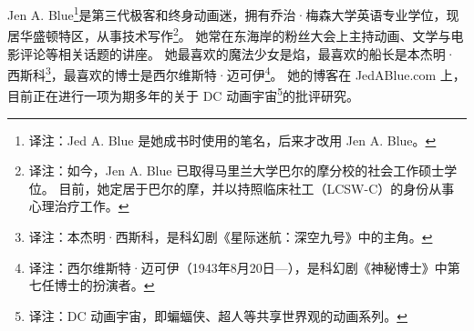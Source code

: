
Jen A. Blue\footnote{%
    译注：Jed A. Blue 是她成书时使用的笔名，后来才改用 Jen A. Blue。
}是第三代极客和终身动画迷，拥有乔治·梅森大学英语专业学位，现居华盛顿特区，从事技术写作\footnote{%
    译注：如今，Jen A. Blue 已取得马里兰大学巴尔的摩分校的社会工作硕士学位。
    目前，她定居于巴尔的摩，并以持照临床社工（LCSW-C）的身份从事心理治疗工作。
}。
她常在东海岸的粉丝大会上主持动画、文学与电影评论等相关话题的讲座。
她最喜欢的魔法少女是焰，最喜欢的船长是本杰明·西斯科\footnote{%
    译注：本杰明·西斯科，是科幻剧《星际迷航：深空九号》中的主角。
}，最喜欢的博士是西尔维斯特·迈可伊\footnote{%
    译注：西尔维斯特·迈可伊（1943年8月20日—），是科幻剧《神秘博士》中第七任博士的扮演者。
}。
她的博客在 JedABlue.com 上，目前正在进行一项为期多年的关于 DC 动画宇宙\footnote{%
    译注：DC 动画宇宙，即蝙蝠侠、超人等共享世界观的动画系列。
}的批评研究。
